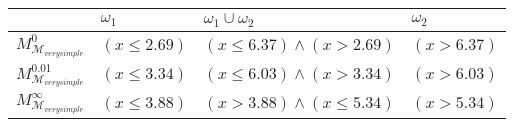 \begin{tabular}{llll}
\toprule
 & $\omega_{1}$ & $\omega_{1} \cup \omega_{2}$ & $\omega_{2}$ \\
\midrule
$M^{0}_{\mathcal{M}_{verysimple}}$ & $(x \leq 2.69)$ & $(x \leq 6.37) \wedge (x > 2.69)$ & $(x > 6.37)$ \\
$M^{0.01}_{\mathcal{M}_{verysimple}}$ & $(x \leq 3.34)$ & $(x \leq 6.03) \wedge (x > 3.34)$ & $(x > 6.03)$ \\
$M^\infty_{\mathcal{M}_{verysimple}}$ & $(x \leq 3.88)$ & $(x > 3.88) \wedge (x \leq 5.34)$ & $(x > 5.34)$ \\
\bottomrule
\end{tabular}
